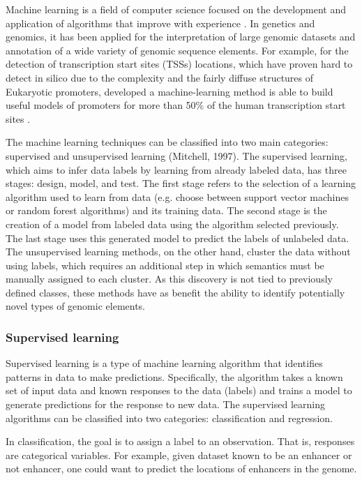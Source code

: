 Machine learning is a field of computer science focused on the development and application of algorithms that improve with experience \cite{mitchell1997machine}.
In genetics and genomics, it has been applied
 for the interpretation of large genomic datasets and annotation of a wide variety of genomic sequence elements.
For example, for the detection of  transcription start sites (TSSs) locations, which have proven hard to detect in silico due to the complexity and the fairly diffuse structures of Eukaryotic promoters,  developed a machine-learning method is able to build useful models of promoters for more than 50\% of the human transcription start sites \cite{down2002computational}.

The machine learning techniques can be classified into two main categories: supervised and unsupervised learning (Mitchell, 1997). The supervised learning, which aims to infer data labels by learning from already labeled data, has three stages: design, model, and test. The first stage refers to the selection of a learning algorithm used to learn from data (e.g. choose between support vector machines or random forest algorithms) and its training data. The second stage is the creation of a model from labeled data using the algorithm selected previously.  The last stage uses this generated model to  predict the labels of unlabeled data.
The unsupervised learning methods, on the other hand,
cluster the data without using labels, which requires an additional step in which semantics must be manually assigned to each cluster. As this discovery is not tied to previously defined classes, these methods have as benefit the ability to identify potentially novel types of genomic elements.




\subsubsection{Supervised learning}

Supervised learning is a type of machine learning algorithm that identifies patterns in data to make predictions.
Specifically, the algorithm takes a known set of input data and known responses to the data (labels) and trains a model to generate predictions for the response to new data.
The supervised learning algorithms can be classified into two categories: classification and regression.

In classification, the goal is to assign a label to an observation. That is, responses are categorical variables.
For example, given dataset known to be
an enhancer or not enhancer, one could want to predict the locations of enhancers in the genome.

